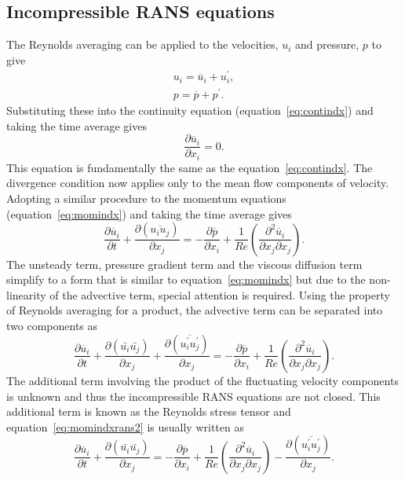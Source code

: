 \subsection{Incompressible RANS equations}\label{ssec:incomprans}
The Reynolds averaging can be applied to the velocities, $u_i$ and pressure, $p$ to give
\begin{align}
u_i = \overline{u}_i + u_i^{\prime}, \nonumber \\
p = \overline{p} + p^{\prime}.
\end{align}
Substituting these into the continuity equation (equation~\ref{eq:contindx}) and taking the time average gives 
\begin{equation}
\frac{\partial \overline{u}_i}{\partial x_i} = 0.
\label{eq:contindxrans}
\end{equation}
This equation is fundamentally the same as the equation~\ref{eq:contindx}. The divergence condition now applies only to the mean flow components of velocity. Adopting a similar procedure to the momentum equations (equation~\ref{eq:momindx}) and taking the time average gives
\begin{equation}
\frac{\partial \overline{u}_i}{\partial t} + \frac{\partial (\overline{u_iu_j})}{\partial x_j} = -\frac{\partial \overline{p}}{\partial x_i} + \frac{1}{Re}\left( \frac{\partial^2 \overline{u}_i}{\partial x_j\partial x_j} \right).
\label{eq:momindxrans1}
\end{equation}
The unsteady term, pressure gradient term and the viscous diffusion term simplify to a form that is similar to equation~\ref{eq:momindx} but due to the non-linearity of the advective term, special attention is required. Using the property of Reynolds averaging for a product, the advective term can be separated into two components as 
\begin{equation}
\frac{\partial \overline{u}_i}{\partial t} + \frac{\partial (\bar{u_i} \bar{u_j})}{\partial x_j} + \frac{\partial (\overline{u_i^{\prime}u_j^{\prime}})}{\partial x_j} = -\frac{\partial \overline{p}}{\partial x_i} + \frac{1}{Re}\left( \frac{\partial^2 \overline{u}_i}{\partial x_j\partial x_j} \right).
\label{eq:momindxrans2}
\end{equation}
The additional term involving the product of the fluctuating velocity components is unknown and thus the incompressible RANS equations are not closed. This additional term is known as the Reynolds stress tensor and equation~\ref{eq:momindxrans2} is usually written as 
\begin{equation}
\frac{\partial \overline{u}_i}{\partial t} + \frac{\partial (\bar{u_i} \bar{u_j})}{\partial x_j} = -\frac{\partial \overline{p}}{\partial x_i} + \frac{1}{Re}\left( \frac{\partial^2 \overline{u}_i}{\partial x_j\partial x_j} \right) - \frac{\partial (\overline{u_i^{\prime}u_j^{\prime}})}{\partial x_j}.
\label{eq:momindxrans3}
\end{equation}

